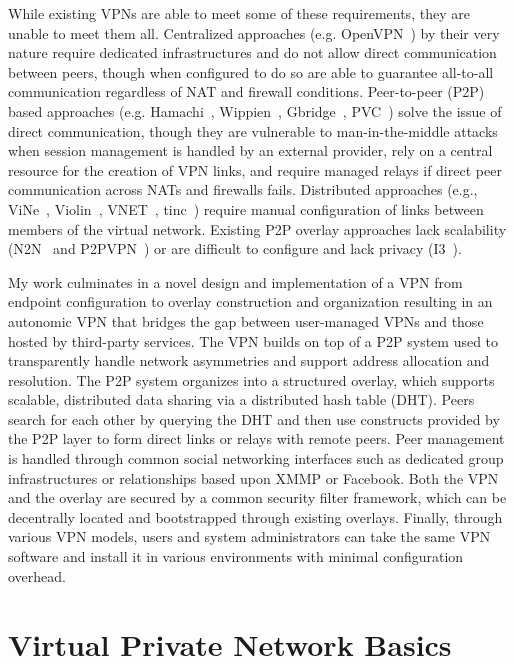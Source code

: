 While existing VPNs are able to meet some of these requirements, they are
unable to meet them all.  Centralized approaches (e.g.  OpenVPN~\cite{openvpn})
by their very nature require dedicated infrastructures and do not allow direct
communication between peers, though when configured to do so are able to
guarantee all-to-all communication regardless of NAT and firewall conditions.
Peer-to-peer (P2P) based approaches (e.g.  Hamachi~\cite{hamachi},
Wippien~\cite{wippien}, Gbridge~\cite{gbridge}, PVC~\cite{pvc}) solve the issue
of direct communication, though they are vulnerable to man-in-the-middle
attacks when session management is handled by an external provider, rely on a
central resource for the creation of VPN links, and require managed relays if
direct peer communication across NATs and firewalls fails.  Distributed
approaches (e.g., ViNe~\cite{vine}, Violin~\cite{violin}, VNET~\cite{vnet},
tinc~\cite{tinc}) require manual configuration of links between members of the
virtual network.  Existing P2P overlay approaches lack scalability
(N2N~\cite{n2n} and P2PVPN~\cite{p2pvpn}) or are difficult to configure and
lack privacy (I3~\cite{i3}).

My work culminates in a novel design and implementation of a VPN from endpoint
configuration to overlay construction and organization resulting in an
autonomic VPN that bridges the gap between user-managed VPNs and those hosted
by third-party services.  The VPN builds on top of a P2P system used to
transparently handle network asymmetries and support address allocation and
resolution.  The P2P system organizes into a structured overlay, which supports
scalable, distributed data sharing via a distributed hash table (DHT).  Peers
search for each other by querying the DHT and then use constructs provided by
the P2P layer to form direct links or relays with remote peers.  Peer
management is handled through common social networking interfaces such as
dedicated group infrastructures or relationships based upon XMMP or Facebook.
Both the VPN and the overlay are secured by a common security filter framework,
which can be decentrally located and bootstrapped through existing overlays.
Finally, through various VPN models, users and system administrators can take
the same VPN software and install it in various environments with minimal
configuration overhead.

\section{Virtual Private Network Basics}

